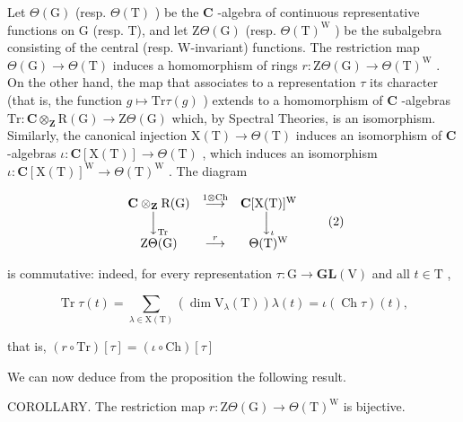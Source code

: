 Let \(\Theta (\mathrm{G})\) (resp. \(\Theta (\mathrm{T})\) ) be the \(\mathbf{C}\) -algebra of continuous representative functions on \(\mathrm{G}\) (resp. T), and let \(\mathrm{Z}\Theta (\mathrm{G})\) (resp. \(\Theta (\mathrm{T})^{\mathrm{W}}\) ) be the subalgebra consisting of the central (resp. W-invariant) functions. The restriction map \(\Theta (\mathrm{G})\to \Theta (\mathrm{T})\) induces a homomorphism of rings \(r:\mathrm{Z}\Theta (\mathrm{G})\rightarrow \Theta (\mathrm{T})^{\mathrm{W}}\) . On the other hand, the map that associates to a representation \(\tau\) its character (that is, the function \(g\mapsto \mathrm{Tr}\tau (g)\) ) extends to a homomorphism of \(\mathbf{C}\) -algebras \(\mathrm{Tr}:\mathbf{C}\otimes_{\mathbf{Z}}\mathrm{R}(\mathrm{G})\to \mathrm{Z}\Theta (\mathrm{G})\) which, by Spectral Theories, is an isomorphism. Similarly, the canonical injection \(\mathrm{X(T)}\to \Theta (\mathrm{T})\) induces an isomorphism of \(\mathbf{C}\) -algebras \(\iota :\mathbf{C}[\mathrm{X(T)}]\to \Theta (\mathrm{T})\) , which induces an isomorphism \(\iota :\mathbf{C}[\mathrm{X(T)}]^{\mathrm{W}}\to \Theta (\mathrm{T})^{\mathrm{W}}\) . The diagram

\[
\begin{array}{c c c} \mathbf {C} \otimes_ {\mathbf {Z}} \mathrm{R(G)} & \stackrel {{1 \otimes \mathrm{Ch}}} {{\longrightarrow}} & \mathbf {C} [ \mathrm{X(T)} ] ^ {\mathrm{W}} \\ \Big \downarrow_ {\mathrm{Tr}} & & \Big \downarrow_ {\iota} \\ \mathrm{Z} \Theta (\mathrm{G}) & \stackrel {{r}} {{\longrightarrow}} & \Theta (\mathrm{T}) ^ {\mathrm{W}} \end{array}\tag{2}
\]

is commutative: indeed, for every representation \(\tau : \mathrm{G} \to \mathbf{GL}(\mathrm{V})\) and all \(t \in \mathrm{T}\) ,

\[
\operatorname{Tr} \tau (t) = \sum_ {\lambda \in \mathrm{X} (\mathrm{T})} \left(\dim \mathrm{V} _ {\lambda} (\mathrm{T})\right) \lambda (t) = \iota (\operatorname{Ch} \tau) (t),
\]

that is, \((r\circ \mathrm{Tr})[\tau ] = (\iota \circ \mathrm{Ch})[\tau ]\)

We can now deduce from the proposition the following result.

COROLLARY. The restriction map \(r: \mathrm{Z}\Theta(\mathrm{G}) \to \Theta(\mathrm{T})^{\mathrm{W}}\) is bijective.


